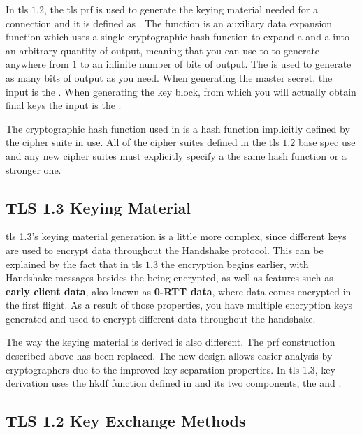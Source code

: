 \documentclass{llncs}
\begin{document}
In \gls{tls} $1.2$, the \gls{tls} \gls{prf} is used to generate the keying material
needed for a connection and it is defined as .
The  function is an auxiliary data expansion function
which uses a single cryptographic hash function to expand a  and a 
into an arbitrary quantity of output, meaning that you can use to to generate
anywhere from $1$ to an infinite number of bits of output. The 
is used to generate as many bits of output as you need. When generating the
master secret, the  input is the .
When generating the key block, from which you will actually obtain final keys
the  input is the .

The cryptographic hash function used in  is
a hash function implicitly defined by the cipher suite in use. All of the cipher
suites defined in the \gls{tls} $1.2$ base spec use  and any new
cipher suites must explicitly specify a the same hash function or a stronger one.

\subsection{TLS 1.3 Keying Material}

\gls{tls} 1.3's keying material generation is a little more complex, since different
keys are used to encrypt data throughout the Handshake protocol. This can be
explained by the fact that in \gls{tls} $1.3$ the encryption begins earlier, with
Handshake messages besides the  being encrypted,
as well as features such as \textbf{early client data}, also known as \textbf{0-RTT data},
where data comes encrypted in the first flight. As a result of those properties,
you have multiple encryption keys generated and used to encrypt different data
throughout the handshake.

The way the keying material is derived is also different. The
\gls{prf} construction described above has been replaced. The
new design allows easier analysis by cryptographers due to the improved
key separation properties. In \gls{tls} 1.3, key derivation uses the
\gls{hkdf} function defined in \cite{RFC5869} and its two components,
the  and .

\subsection{TLS 1.2 Key Exchange Methods}
\end{document}
